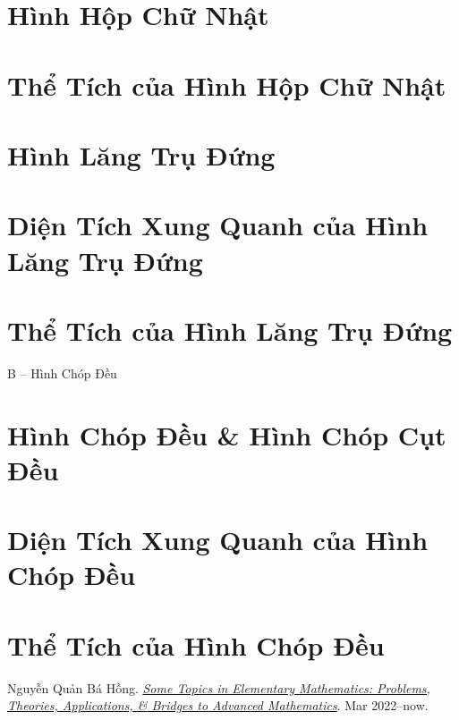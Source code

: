 \documentclass[oneside]{book}
\numberwithin{equation}{section}
\begin{document}
\section{Hình Hộp Chữ Nhật}

\section{Thể Tích của Hình Hộp Chữ Nhật}

\section{Hình Lăng Trụ Đứng}

\section{Diện Tích Xung Quanh của Hình Lăng Trụ Đứng}

\section{Thể Tích của Hình Lăng Trụ Đứng}

\begin{center}
	\Large B -- Hình Chóp Đều
\end{center}

\section{Hình Chóp Đều \& Hình Chóp Cụt Đều}

\section{Diện Tích Xung Quanh của Hình Chóp Đều}

\section{Thể Tích của Hình Chóp Đều}


\begin{thebibliography}{99}
	 Nguyễn Quản Bá Hồng. \href{https://github.com/NQBH/hobby/blob/master/elementary_mathematics/NQBH_elementary_mathematics.pdf}{\textit{Some Topics in Elementary Mathematics: Problems, Theories, Applications, \textit{\&} Bridges to Advanced Mathematics}}. Mar 2022--now.
\end{thebibliography}


\printbibliography[heading=bibintoc]
	
\end{document}
